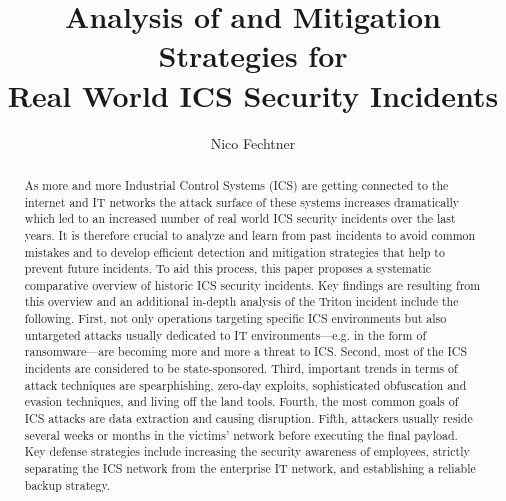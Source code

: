 \documentclass[runningheads]{llncs}
\begin{document}
%
\title{Analysis of and Mitigation Strategies for \\Real World ICS Security Incidents}
%
%
\author{Nico Fechtner}
%
%
%
\maketitle              %
%
\begin{abstract}
As more and more Industrial Control Systems (ICS) are getting connected to the internet and IT networks the attack surface of these systems increases dramatically which led to an increased number of real world ICS security incidents over the last years.
It is therefore crucial to analyze and learn from past incidents to avoid common mistakes and to develop efficient detection and mitigation strategies that help to prevent future incidents.
To aid this process, this paper proposes a systematic comparative overview of historic ICS security incidents.
Key findings are resulting from this overview and an additional in-depth analysis of the Triton incident include the following.
First, not only operations targeting specific ICS environments but also untargeted attacks usually dedicated to IT environments---e.g. in the form of ransomware---are becoming more and more a threat to ICS.
Second, most of the ICS incidents are considered to be state-sponsored.
Third, important trends in terms of attack techniques are spearphishing, zero-day exploits, sophisticated obfuscation and evasion techniques, and living off the land tools.
Fourth, the most common goals of ICS attacks are data extraction and causing disruption.
Fifth, attackers usually reside several weeks or months in the victims' network before executing the final payload.
Key defense strategies include increasing the security awareness of employees, strictly separating the ICS network from the enterprise IT network, and establishing a reliable backup strategy.

\end{abstract}
%
%
%
\end{document}
